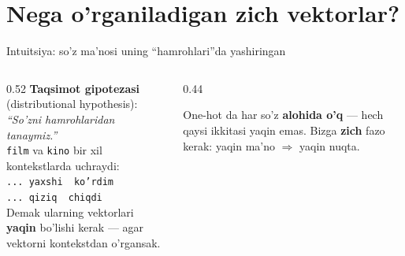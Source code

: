 \documentclass[aspectratio=169,11pt]{beamer}
\begin{document}
\section[Zich vektor]{Nega o'rganiladigan zich vektorlar?}

\begin{frame}{Intuitsiya: so'z ma'nosi uning ``hamrohlari''da yashiringan}
  \begin{columns}[T]
    \begin{column}{0.52\textwidth}
      \small
      \textbf{Taqsimot gipotezasi} (distributional hypothesis):\\[3pt]
      \textit{``So'zni hamrohlaridan tanaymiz.''}\\[6pt]
      \texttt{film} va \texttt{kino} bir xil kontekstlarda uchraydi:\\[3pt]
      \texttt{... yaxshi \underline{\hspace{0.8cm}} ko'rdim}\\
      \texttt{... qiziq \underline{\hspace{0.8cm}} chiqdi}\\[6pt]
      Demak ularning vektorlari \textbf{yaqin} bo'lishi kerak --- agar
      vektorni kontekstdan o'rgansak.
    \end{column}
    \begin{column}{0.44\textwidth}
      \begin{tcolorbox}[okbox,top=2pt,bottom=2pt]
        \footnotesize
        One-hot da har so'z \textbf{alohida o'q} --- hech qaysi ikkitasi yaqin
        emas. Bizga \textbf{zich} fazo kerak: yaqin ma'no $\Rightarrow$ yaqin
        nuqta.
      \end{tcolorbox}
    \end{column}
  \end{columns}
\end{frame}
\end{document}

